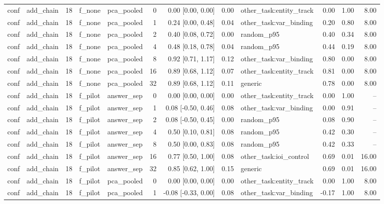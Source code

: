 \begin{tabular}{llrllrrrlrrr}
conf & add\_chain & 18 & f\_none & pca\_pooled & 0 & 0.00 [0.00, 0.00] & 0.00 & other\_task:entity\_track & 0.00 & 1.00 & 8.00 \\
conf & add\_chain & 18 & f\_none & pca\_pooled & 1 & 0.24 [0.00, 0.48] & 0.04 & other\_task:var\_binding & 0.20 & 0.80 & 8.00 \\
conf & add\_chain & 18 & f\_none & pca\_pooled & 2 & 0.40 [0.08, 0.72] & 0.00 & random\_p95 & 0.40 & 0.34 & 8.00 \\
conf & add\_chain & 18 & f\_none & pca\_pooled & 4 & 0.48 [0.18, 0.78] & 0.04 & random\_p95 & 0.44 & 0.19 & 8.00 \\
conf & add\_chain & 18 & f\_none & pca\_pooled & 8 & 0.92 [0.71, 1.17] & 0.12 & other\_task:var\_binding & 0.80 & 0.00 & 8.00 \\
conf & add\_chain & 18 & f\_none & pca\_pooled & 16 & 0.89 [0.68, 1.12] & 0.07 & other\_task:entity\_track & 0.81 & 0.00 & 8.00 \\
conf & add\_chain & 18 & f\_none & pca\_pooled & 32 & 0.89 [0.68, 1.12] & 0.11 & generic & 0.78 & 0.00 & 8.00 \\
conf & add\_chain & 18 & f\_pilot & answer\_sep & 0 & 0.00 [0.00, 0.00] & 0.00 & other\_task:entity\_track & 0.00 & 1.00 & -- \\
conf & add\_chain & 18 & f\_pilot & answer\_sep & 1 & 0.08 [-0.50, 0.46] & 0.08 & other\_task:var\_binding & 0.00 & 0.91 & -- \\
conf & add\_chain & 18 & f\_pilot & answer\_sep & 2 & 0.08 [-0.50, 0.45] & 0.00 & random\_p95 & 0.08 & 0.90 & -- \\
conf & add\_chain & 18 & f\_pilot & answer\_sep & 4 & 0.50 [0.10, 0.81] & 0.08 & random\_p95 & 0.42 & 0.30 & -- \\
conf & add\_chain & 18 & f\_pilot & answer\_sep & 8 & 0.50 [0.00, 0.83] & 0.08 & random\_p95 & 0.42 & 0.33 & -- \\
conf & add\_chain & 18 & f\_pilot & answer\_sep & 16 & 0.77 [0.50, 1.00] & 0.08 & other\_task:ioi\_control & 0.69 & 0.01 & 16.00 \\
conf & add\_chain & 18 & f\_pilot & answer\_sep & 32 & 0.85 [0.62, 1.00] & 0.15 & generic & 0.69 & 0.01 & 16.00 \\
conf & add\_chain & 18 & f\_pilot & pca\_pooled & 0 & 0.00 [0.00, 0.00] & 0.00 & other\_task:entity\_track & 0.00 & 1.00 & 8.00 \\
conf & add\_chain & 18 & f\_pilot & pca\_pooled & 1 & -0.08 [-0.33, 0.00] & 0.08 & other\_task:var\_binding & -0.17 & 1.00 & 8.00 \\

\end{tabular}
